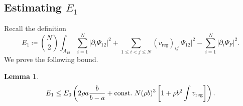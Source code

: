 \documentclass[a4paper,11pt]{article}
\newcommand{\abs}[1]{\left\lvert #1 \right\rvert}
\newtheorem{lemma}[theorem]{Lemma}
\numberwithin{equation}{section}
\begin{document}
	\subsection{Estimating $ E_1 $}
	\label{secE1}
		Recall the definition \begin{equation}
		E_1\coloneqq\binom{N}{2}\int_{A_{12}} \sum_{i=1}^{N}\abs{\partial_i\Psi_{12}}^2+\sum_{1\leq i<j\leq N}(v_{\text{reg}})_{ij}\abs{\Psi_{12}}^2-\sum_{i=1}^{N}\abs{\partial_i\Psi_F}^2.
		\end{equation}
		We prove the following bound. \begin{lemma}\label{LemmaE1Bound}
			\begin{equation}
			E_1\leq E_0 \left(2\rho a\frac{b}{b-a}+ \textnormal{const.}\ N(\rho b)^3\left[ 1+ \rho b^2\int v_{\textnormal{reg}}\right]\right).
			\end{equation}
		\end{lemma}
\end{document}

